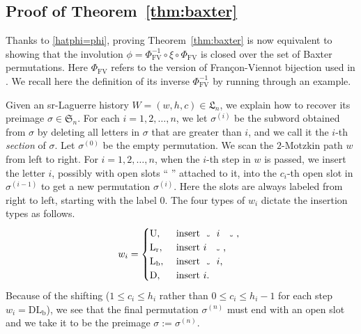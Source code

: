 \documentclass[12pt,reqno]{amsart}
\numberwithin{equation}{section}
\theoremstyle{plain}
\theoremstyle{definition}
\def\Sym{\mathfrak{S}}
\def\FV{\mathrm{FV}}
\def\rU{\operatorname{U}}
\def\rD{\operatorname{D}}
\def\rLr{\operatorname{L_r}}
\def\rLb{\operatorname{L_b}}
\def\DLb{\operatorname{DL_b}}
\def\LH{\mathfrak{L}}
\newcommand\varspace[1][.7em]{
  \makebox[#1]{
    \kern.07em
    \vrule height.3ex
    \hrulefill
    \vrule height.3ex
    \kern.07em
  }
}
\begin{document}
\subsection{Proof of Theorem~\ref{thm:baxter}}\label{subsec:proof_of_theorem_ref_thm_baxter}
Thanks to \eqref{hatphi=phi}, proving Theorem~\ref{thm:baxter} is now equivalent to showing that the involution $\phi=\Phi_{\FV}^{-1}\circ\xi\circ\Phi_{\FV}$ is closed over the set of Baxter permutations. Here $\Phi_{\FV}$ refers to the version of Fran\c con-Viennot bijection used in \cite[p.~12--13]{CF23}. We recall here the definition of its inverse $\Phi_{\FV}^{-1}$ by running through an example. 

Given an sr-Laguerre history $W=(w,h,c)\in\LH_n$, we explain how to recover its preimage $\sigma\in\Sym_n$. For each $i=1,2,\ldots,n$, we let $\sigma^{(i)}$ be the subword obtained from $\sigma$ by deleting all letters in $\sigma$ that are greater than $i$, and we call it the $i$-th \emph{section} of $\sigma$. Let $\sigma^{(0)}$ be the empty permutation. We scan the $2$-Motzkin path $w$ from left to right. For $i=1,2,\ldots,n$, when the $i$-th step in $w$ is passed, we insert the letter $i$, possibly with open slots ``\varspace[.5em]'' attached to it, into the $c_i$-th open slot in $\sigma^{(i-1)}$ to get a new permutation $\sigma^{(i)}$. Here the slots are always labeled from right to left, starting with the label $0$. The four types of $w_i$ dictate the insertion types as follows.
\begin{align*}
  w_i=
    \begin{cases}
      \rU, & \text{ insert \varspace~$i$~\varspace, }\\
      \rLr, & \text{ insert $i$~\varspace, }\\
      \rLb, & \text{ insert \varspace~$i$, }\\
      \rD, & \text{ insert $i$. }\\
    \end{cases}
\end{align*}
Because of the shifting ($1\le c_i\le h_i$ rather than $0\le c_i\le h_i-1$ for each step $w_i=\DLb$), we see that the final permutation $\sigma^{(n)}$ must end with an open slot and we take it to be the preimage $\sigma:=\sigma^{(n)}$. 
\end{document}
